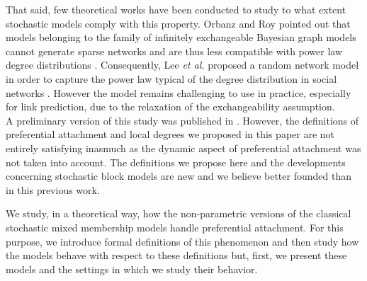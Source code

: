 That said, few theoretical works have been conducted to study to what extent stochastic models comply with this property. 
Orbanz and Roy  pointed out that models belonging to the family of infinitely exchangeable Bayesian graph models cannot generate sparse networks and are thus less compatible with power law degree distributions \cite{orbanz2015bayesian}. Consequently, Lee \textit{et al.}  proposed a random network model in order to capture the power law typical of the degree distribution in social networks \cite{Lee2015}. However the model remains challenging to use in practice, especially for link prediction, due to the relaxation of the exchangeability assumption.~\\


A preliminary version of this study was published in \cite{dulac-dsaa}. However, the definitions of preferential attachment and local degrees we proposed in this paper are not entirely satisfying inasmuch as the dynamic aspect of preferential attachment was not taken into account. The definitions we propose here and the developments concerning stochastic block models are new and we believe better founded than in this previous work.

We study, in a theoretical way, how the non-parametric versions of the classical stochastic mixed membership models handle preferential attachment. For this purpose, we introduce formal definitions of this phenomenon and then study how the models behave with respect  to these definitions but, first,  we present these models and the settings in which we study their behavior.
